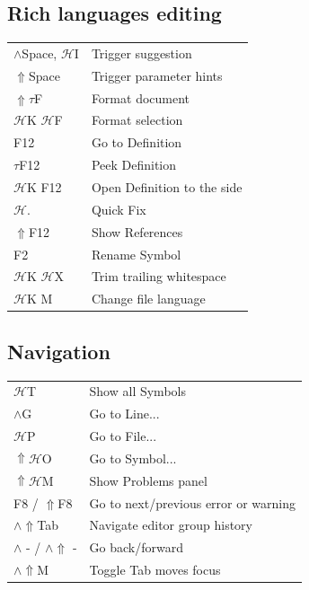 \documentclass[UTF8]{article}
\begin{document}
\subsection*{Rich languages editing}
\begin{tabular}{ll}
$\wedge$Space, $\mathscr{H}$I & Trigger suggestion \\
$\Uparrow$Space & Trigger parameter hints \\
$\Uparrow\tau$F & Format document \\
$\mathscr{H}$K $\mathscr{H}$F & Format selection \\
F12 & Go to Definition \\
$\tau$F12 & Peek Definition \\
$\mathscr{H}$K F12 & Open Definition to the side \\
$\mathscr{H}$. & Quick Fix \\
$\Uparrow$F12 & Show References \\
F2 & Rename Symbol \\
$\mathscr{H}$K $\mathscr{H}$X & Trim trailing whitespace \\
$\mathscr{H}$K M & Change file language \\
\end{tabular}

\subsection*{Navigation}
\begin{tabular}{ll}
$\mathscr{H}$T & Show all Symbols \\
$\wedge$G & Go to Line... \\
$\mathscr{H}$P & Go to File... \\
$\Uparrow\mathscr{H}$O & Go to Symbol... \\
$\Uparrow\mathscr{H}$M & Show Problems panel \\
F8 / $\Uparrow$F8 & Go to next/previous error or warning \\
$\wedge\Uparrow$Tab & Navigate editor group history \\
$\wedge$ - / $\wedge\Uparrow$ - & Go back/forward \\
$\wedge\Uparrow$M & Toggle Tab moves focus \\
\end{tabular}
\end{document}
